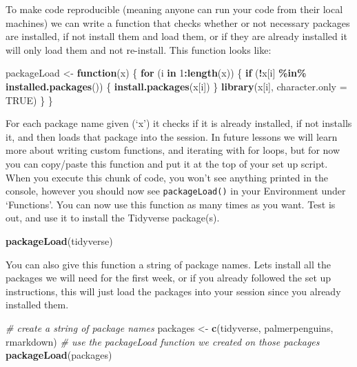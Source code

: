 \documentclass[
]{book}
\newenvironment{Shaded}{\begin{snugshade}}{\end{snugshade}}
\newcommand{\AttributeTok}[1]{\textcolor[rgb]{0.13,0.29,0.53}{#1}}
\newcommand{\CommentTok}[1]{\textcolor[rgb]{0.56,0.35,0.01}{\textit{#1}}}
\newcommand{\ConstantTok}[1]{\textcolor[rgb]{0.56,0.35,0.01}{#1}}
\newcommand{\ControlFlowTok}[1]{\textcolor[rgb]{0.13,0.29,0.53}{\textbf{#1}}}
\newcommand{\DecValTok}[1]{\textcolor[rgb]{0.00,0.00,0.81}{#1}}
\newcommand{\FunctionTok}[1]{\textcolor[rgb]{0.13,0.29,0.53}{\textbf{#1}}}
\newcommand{\NormalTok}[1]{#1}
\newcommand{\OtherTok}[1]{\textcolor[rgb]{0.56,0.35,0.01}{#1}}
\newcommand{\SpecialCharTok}[1]{\textcolor[rgb]{0.81,0.36,0.00}{\textbf{#1}}}
\newcommand{\StringTok}[1]{\textcolor[rgb]{0.31,0.60,0.02}{#1}}
\begin{document}
To make code reproducible (meaning anyone can run your code from their local machines) we can write a function that checks whether or not necessary packages are installed, if not install them and load them, or if they are already installed it will only load them and not re-install. This function looks like:

\begin{Shaded}
\begin{Highlighting}[]
\NormalTok{packageLoad }\OtherTok{\textless{}{-}}
  \ControlFlowTok{function}\NormalTok{(x) \{}
    \ControlFlowTok{for}\NormalTok{ (i }\ControlFlowTok{in} \DecValTok{1}\SpecialCharTok{:}\FunctionTok{length}\NormalTok{(x)) \{}
      \ControlFlowTok{if}\NormalTok{ (}\SpecialCharTok{!}\NormalTok{x[i] }\SpecialCharTok{\%in\%} \FunctionTok{installed.packages}\NormalTok{()) \{}
        \FunctionTok{install.packages}\NormalTok{(x[i])}
\NormalTok{      \}}
      \FunctionTok{library}\NormalTok{(x[i], }\AttributeTok{character.only =} \ConstantTok{TRUE}\NormalTok{)}
\NormalTok{    \}}
\NormalTok{  \}}
\end{Highlighting}
\end{Shaded}

For each package name given (`x') it checks if it is already installed, if not installs it, and then loads that package into the session. In future lessons we will learn more about writing custom functions, and iterating with for loops, but for now you can copy/paste this function and put it at the top of your set up script. When you execute this chunk of code, you won't see anything printed in the console, however you should now see \texttt{packageLoad()} in your Environment under `Functions'. You can now use this function as many times as you want. Test is out, and use it to install the Tidyverse package(s).

\begin{Shaded}
\begin{Highlighting}[]
\FunctionTok{packageLoad}\NormalTok{(}\StringTok{\textquotesingle{}tidyverse\textquotesingle{}}\NormalTok{)}
\end{Highlighting}
\end{Shaded}

You can also give this function a string of package names. Lets install all the packages we will need for the first week, or if you already followed the set up instructions, this will just load the packages into your session since you already installed them.

\begin{Shaded}
\begin{Highlighting}[]
\CommentTok{\# create a string of package names}
\NormalTok{packages }\OtherTok{\textless{}{-}} \FunctionTok{c}\NormalTok{(}\StringTok{\textquotesingle{}tidyverse\textquotesingle{}}\NormalTok{,}
              \StringTok{\textquotesingle{}palmerpenguins\textquotesingle{}}\NormalTok{,}
              \StringTok{\textquotesingle{}rmarkdown\textquotesingle{}}\NormalTok{)}
\CommentTok{\# use the packageLoad function we created on those packages}
\FunctionTok{packageLoad}\NormalTok{(packages)}
\end{Highlighting}
\end{Shaded}
\end{document}
